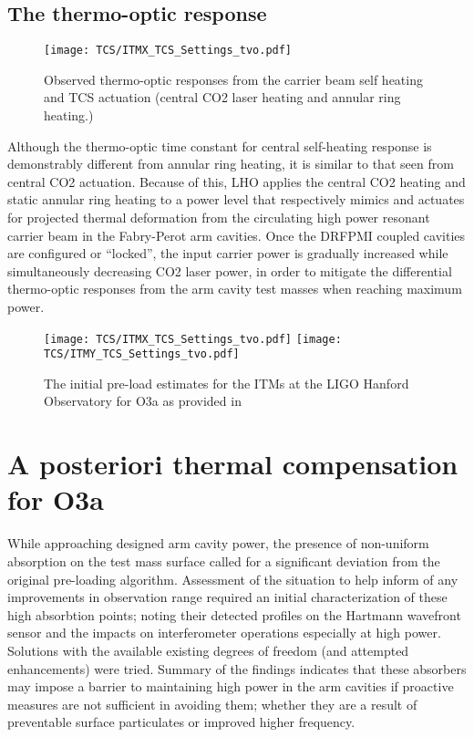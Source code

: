 \subsection{The thermo-optic response}
\begin{figure}[!h]
  \centering
  \begin{subcaptiongroup}
	  \texttt{[image: TCS/ITMX\_TCS\_Settings\_tvo.pdf]}
	  \label{ITMX_TCS}
  \end{subcaptiongroup}
  \captionsetup{subrefformat=parens}
  \hfill
  \caption{Observed thermo-optic responses from the carrier beam self heating and TCS actuation (central CO2 laser heating and annular ring heating.)} 
\label{fig:thermooptic_response}
\end{figure}
Although the thermo-optic time constant for central self-heating response is demonstrably different from annular ring heating, it is similar to that seen from central CO2 actuation. Because of this, LHO applies the central CO2 heating and static annular ring heating to a power level that respectively mimics and actuates for projected thermal deformation from the circulating high power resonant carrier beam in the Fabry-Perot arm cavities. Once the DRFPMI coupled cavities are configured or ``locked'', the input carrier power is gradually increased while simultaneously decreasing CO2 laser power, in order to mitigate the differential thermo-optic responses from the arm cavity test masses when reaching maximum power.
\begin{figure}[!h]
  \centering
  \begin{subcaptiongroup}
	  \texttt{[image: TCS/ITMX\_TCS\_Settings\_tvo.pdf]}
	  \label{ITMX_TCS}
	  \texttt{[image: TCS/ITMY\_TCS\_Settings\_tvo.pdf]}
	  \label{ITMY_TCS}
  \end{subcaptiongroup}
  \captionsetup{subrefformat=parens}
  \hfill
  \caption{The initial pre-load estimates for the ITMs at the LIGO Hanford Observatory for O3a as provided in \cite{tvo}} 
  \label{fig:O3_preload_tvo}
\end{figure}


\section{A posteriori thermal compensation for O3a}
While approaching designed arm cavity power, the presence of non-uniform absorption on the test mass surface called for a significant deviation from the original pre-loading algorithm. Assessment of the situation to help inform of any improvements in observation range required an initial characterization of these high absorbtion points; noting their detected profiles on the Hartmann wavefront sensor and the impacts on interferometer operations especially at high power. Solutions with the available existing degrees of freedom (and attempted enhancements) were tried. Summary of the findings indicates that these absorbers may impose a barrier to maintaining high power in the arm cavities if proactive measures are not sufficient in avoiding them; whether they are a result of preventable surface particulates or improved higher frequency.  

